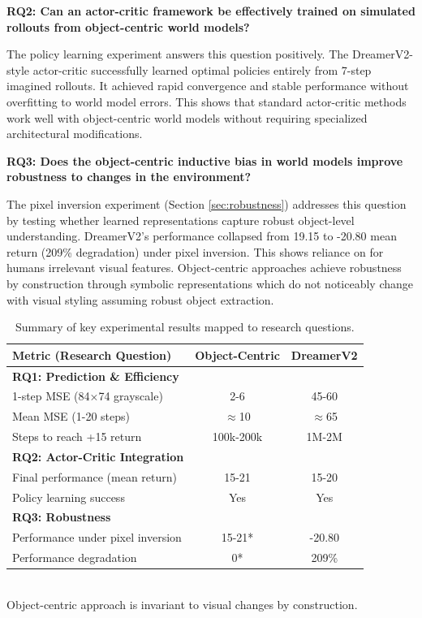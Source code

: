 \documentclass[
	english,
	ruledheaders=section,
	class=report,
	thesis={type=master},
	accentcolor=9c,
	custommargins=true,
	marginpar=false,
	parskip=half-,
	fontsize=11pt,
	pdfa=true,
]{tudapub}
\newcommand{\worldmodel}{world model}
\begin{document}
\textbf{RQ2: Can an actor-critic framework be effectively trained on simulated
	rollouts from object-centric \worldmodel{}s?}

The policy learning experiment answers this question positively. The
DreamerV2-style actor-critic successfully learned optimal policies entirely
from 7-step imagined rollouts. It achieved rapid convergence and stable
performance without overfitting to \worldmodel{} errors. This shows that
standard actor-critic methods work well with object-centric \worldmodel{}s
without requiring specialized architectural modifications.

\textbf{RQ3: Does the object-centric inductive bias in \worldmodel{}s improve
	robustness to changes in the environment?}

The pixel inversion experiment (Section \ref{sec:robustness}) addresses this
question by testing whether learned representations capture robust object-level
understanding. DreamerV2's performance collapsed from 19.15 to -20.80 mean
return (209\% degradation) under pixel inversion. This shows reliance on for
humans irrelevant visual features. Object-centric approaches achieve robustness
by construction through symbolic representations which do not noticeably change
with visual styling assuming robust object extraction.

\begin{table}[ht]
	\centering
	\caption[Summary of experimental results]{Summary of key experimental results mapped to research questions.}
	\label{tab:summary_results}
	\begin{tabular}{lcc}
		\toprule
		Metric (Research Question)             & Object-Centric & DreamerV2   \\
		\midrule
		\textbf{RQ1: Prediction \& Efficiency} &                &             \\
		1-step MSE (84×74 grayscale)           & 2-6            & 45-60       \\
		Mean MSE (1-20 steps)                  & $\approx$10    & $\approx$65 \\
		Steps to reach +15 return              & 100k-200k      & 1M-2M       \\
		\midrule
		\textbf{RQ2: Actor-Critic Integration} &                &             \\
		Final performance (mean return)        & 15-21          & 15-20       \\
		Policy learning success                & Yes            & Yes         \\
		\midrule
		\textbf{RQ3: Robustness}               &                &             \\
		Performance under pixel inversion      & 15-21*           & -20.80      \\
		Performance degradation                & 0*           & 209\%       \\
		\bottomrule
	\end{tabular}
	\\ \vspace{0.2cm}
	{\footnotesize *Object-centric approach is invariant to visual changes by construction.}
\end{table}
\end{document}

